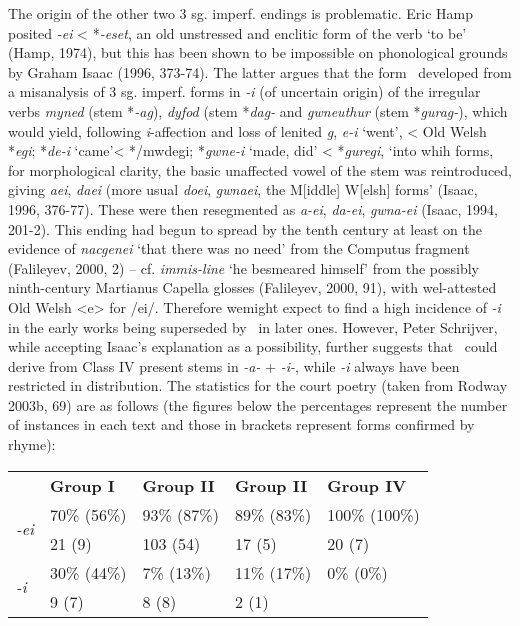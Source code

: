{The origin of the other two 3 sg. imperf. endings is problematic. Eric Hamp posited \textit{-ei} < *\textit{-eset}, an old unstressed and enclitic form of the verb `to be' (Hamp, 1974), but this has been shown to be impossible on phonological grounds by Graham Isaac (1996, 373-74). The latter argues that the form \ei\ developed from a misanalysis of 3 sg. imperf. forms in \textit{-i} (of uncertain origin) of the irregular verbs \textit{myned} (stem *\textit{-ag}), \textit{dyfod} (stem *\textit{dag-} and \textit{gwneuthur} (stem *\textit{gurag-}), which would yield, following \textit{i}-affection and loss of lenited \textit{g}, \textit{e-i} `went', < Old Welsh *\textit{egi}; *\textit{de-i} `came'< */mw{degi}; *\textit{gwne-i} `made, did' < *\textit{guregi}, `into whih forms, for morphological clarity, the basic unaffected vowel of the stem was reintroduced, giving \textit{aei}, \textit{daei} (more usual \textit{doei}, \textit{gwnaei}, the M[iddle] W[elsh] forms' (Isaac, 1996, 376-77). These were then resegmented as \textit{a-ei}, \textit{da-ei}, \textit{gwna-ei} (Isaac, 1994, 201-2). This ending had begun to spread by the tenth century at least on the evidence of \textit{nacgenei} `that there was no need' from the Computus fragment (Falileyev, 2000, 2) -- cf. \textit{immis-line} `he besmeared himself' from the possibly ninth-century Martianus Capella glosses (Falileyev, 2000, 91), with wel-attested Old Welsh <e> for /ei/. Therefore wemight expect to find a high incidence of \textit{-i} in the early works being superseded by \ei\ in later ones. However, Peter Schrijver, while accepting Isaac's explanation as a possibility, further suggests that \ei\ could derive from Class IV present stems in \textit{-a-} + \textit{-i-}, while \textit{-i} always have been restricted in distribution. The statistics for the court poetry (taken from Rodway 2003b, 69) are as follows (the figures below the percentages represent the number of instances in each text and those in brackets represent forms confirmed by rhyme):

\begin{table}[H]
\centering
\label{my-label}
\begin{tabular}{lllll}
                          & \textbf{Group I} & \textbf{Group II} & \textbf{Group II} & \textbf{Group IV} \\
\multirow{2}{*}{\textit{-ei}} & 70\% (56\%)      & 93\% (87\%)       & 89\% (83\%)       & 100\% (100\%)     \\
                          & 21 (9)           & 103 (54)          & 17 (5)            & 20 (7)            \\
\multirow{2}{*}{\textit{-i}}  & 30\% (44\%)      & 7\% (13\%)        & 11\% (17\%)       & 0\% (0\%)         \\
                          & 9 (7)            & 8 (8)             & 2 (1)             &                  
\end{tabular}
\end{table}

}
